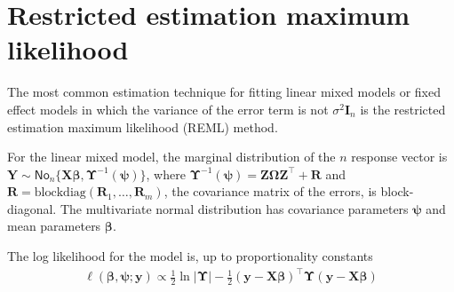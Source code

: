 \documentclass[
  11pt,
  letterpaper,
]{book}
\theoremstyle{definition}
\theoremstyle{definition}
\theoremstyle{definition}
\theoremstyle{definition}
\theoremstyle{remark}
\begin{document}
\hypertarget{restricted-estimation-maximum-likelihood}{%
\section{Restricted estimation maximum likelihood}\label{restricted-estimation-maximum-likelihood}}

The most common estimation technique for fitting linear mixed models or fixed effect models in which the variance of the error term is not \(\sigma^2\mathbf{I}_n\) is the restricted estimation maximum likelihood (REML) method.

For the linear mixed model, the marginal distribution of the \(n\) response vector is
\(\boldsymbol{Y} \sim \mathsf{No}_n\{\mathbf{X} \boldsymbol{\beta}, \boldsymbol{\Upsilon}^{-1}(\boldsymbol{\psi})\}\), where \(\boldsymbol{\Upsilon}^{-1}(\boldsymbol{\psi}) = \mathbf{Z}\boldsymbol{\Omega}\mathbf{Z}^\top + \mathbf{R}\) and \(\mathbf{R} = \mathrm{blockdiag}(\mathbf{R}_1, \ldots, \mathbf{R}_m)\), the covariance matrix of the errors, is block-diagonal. The multivariate normal distribution has covariance parameters \(\boldsymbol{\psi}\) and mean parameters \(\boldsymbol{\beta}\).

The log likelihood for the model is, up to proportionality constants
\begin{align*}
\ell(\boldsymbol{\beta},\boldsymbol{\psi}; \boldsymbol{y}) \propto  \frac{1}{2} \ln |\boldsymbol{\Upsilon}|- \frac{1}{2} (\boldsymbol{y}- \mathbf{X}\boldsymbol{\beta})^\top\boldsymbol{\Upsilon}(\boldsymbol{y}-\mathbf{X}\boldsymbol{\beta})
\end{align*}
\end{document}
